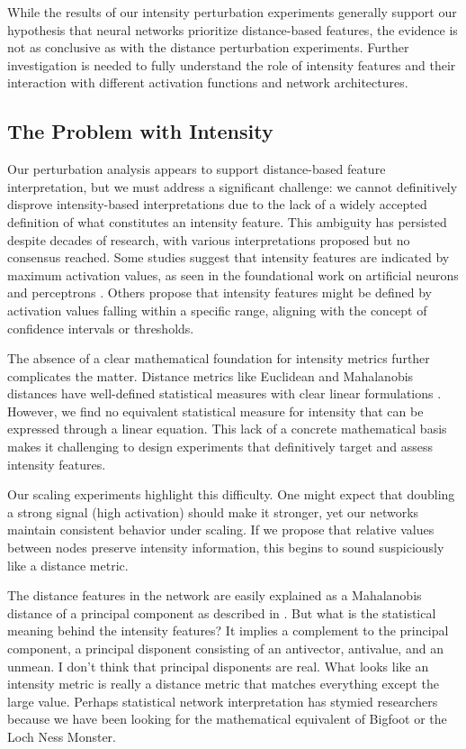 While the results of our intensity perturbation experiments generally support our hypothesis that neural networks prioritize distance-based features, the evidence is not as conclusive as with the distance perturbation experiments. Further investigation is needed to fully understand the role of intensity features and their interaction with different activation functions and network architectures.

\subsection{The Problem with Intensity}

Our perturbation analysis appears to support distance-based feature interpretation, but we must address a significant challenge: we cannot definitively disprove intensity-based interpretations due to the lack of a widely accepted definition of what constitutes an intensity feature. This ambiguity has persisted despite decades of research, with various interpretations proposed but no consensus reached. Some studies suggest that intensity features are indicated by maximum activation values, as seen in the foundational work on artificial neurons and perceptrons \citep{mcculloch1943logical,rosenblatt1958perceptron}. Others propose that intensity features might be defined by activation values falling within a specific range, aligning with the concept of confidence intervals or thresholds.

The absence of a clear mathematical foundation for intensity metrics further complicates the matter. Distance metrics like Euclidean and Mahalanobis distances have well-defined statistical measures with clear linear formulations \citep{deza2009encyclopedia,mahalanobis1936generalized}. However, we find no equivalent statistical measure for intensity that can be expressed through a linear equation. This lack of a concrete mathematical basis makes it challenging to design experiments that definitively target and assess intensity features.

Our scaling experiments highlight this difficulty. One might expect that doubling a strong signal (high activation) should make it stronger, yet our networks maintain consistent behavior under scaling. If we propose that relative values between nodes preserve intensity information, this begins to sound suspiciously like a distance metric.

The distance features in the network are easily explained as a Mahalanobis distance of a principal component as described in \citep{oursland2024interpreting}. But what is the statistical meaning behind the intensity features? It implies a complement to the principal component, a principal disponent consisting of an antivector, antivalue, and an unmean. I don't think that principal disponents are real. What looks like an intensity metric is really a distance metric that matches everything except the large value. Perhaps statistical network interpretation has stymied researchers because we have been looking for the mathematical equivalent of Bigfoot or the Loch Ness Monster.